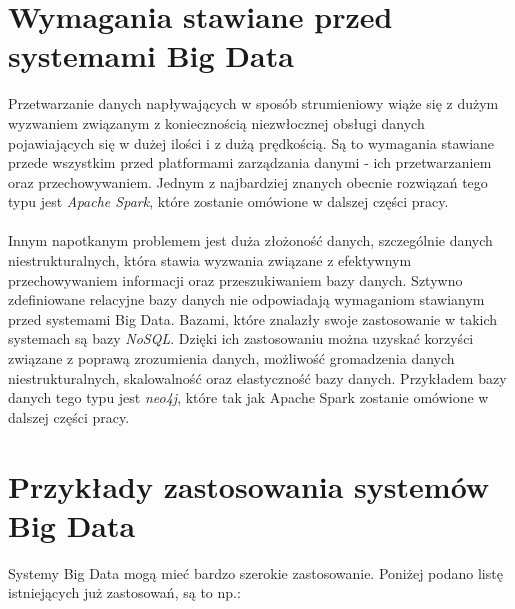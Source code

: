 \section{Wymagania stawiane przed systemami Big Data}
Przetwarzanie danych napływających w sposób strumieniowy wiąże się z dużym wyzwaniem związanym z koniecznością niezwłocznej obsługi danych pojawiających się w dużej ilości i z dużą prędkością. Są to wymagania stawiane przede wszystkim przed platformami zarządzania danymi - ich przetwarzaniem oraz przechowywaniem. Jednym z najbardziej znanych obecnie rozwiązań tego typu jest \textit{Apache Spark}, które zostanie omówione w dalszej części pracy. \\
\\
Innym napotkanym problemem jest duża złożoność danych, szczególnie danych niestrukturalnych, która stawia wyzwania związane z efektywnym przechowywaniem informacji oraz przeszukiwaniem bazy danych. Sztywno zdefiniowane relacyjne bazy danych nie odpowiadają wymaganiom stawianym przed systemami Big Data. Bazami, które znalazły swoje zastosowanie w takich systemach są bazy \textit{NoSQL}. Dzięki ich zastosowaniu można uzyskać korzyści związane z poprawą zrozumienia danych, możliwość gromadzenia danych niestrukturalnych, skalowalność oraz elastyczność bazy danych. Przykładem bazy danych tego typu jest \textit{neo4j}, które tak jak Apache Spark zostanie omówione w dalszej części pracy.

\section{Przykłady zastosowania systemów Big Data}
Systemy Big Data mogą mieć bardzo szerokie zastosowanie. Poniżej podano listę istniejących już zastosowań, są to np.:

